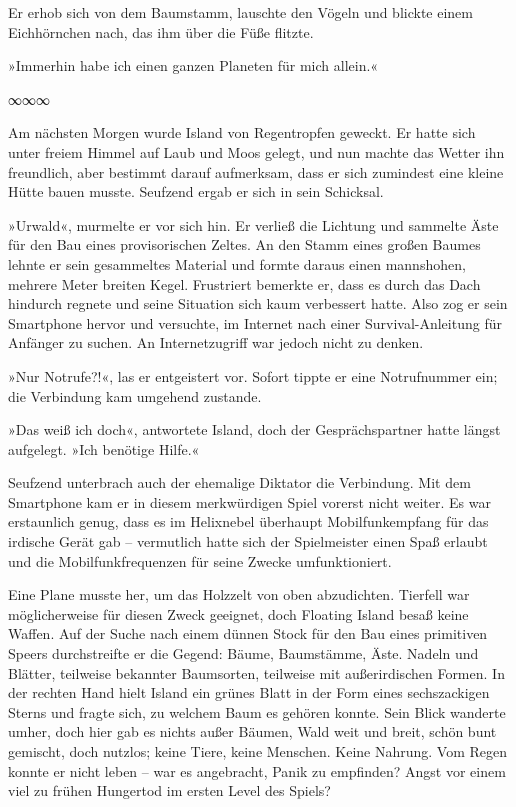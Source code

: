 Er erhob sich von dem Baumstamm, lauschte den Vögeln und blickte einem Eichhörnchen nach, das ihm über die Füße flitzte.

»Immerhin habe ich einen ganzen Planeten für mich allein.«

\begin{center}
∞∞∞
\end{center}

Am nächsten Morgen wurde Island von Regentropfen geweckt. Er hatte sich unter freiem Himmel auf Laub und Moos gelegt, und nun machte das Wetter ihn freundlich, aber bestimmt darauf aufmerksam, dass er sich zumindest eine kleine Hütte bauen musste. Seufzend ergab er sich in sein Schicksal.

»Urwald«, murmelte er vor sich hin. Er verließ die Lichtung und sammelte Äste für den Bau eines provisorischen Zeltes. An den Stamm eines großen Baumes lehnte er sein gesammeltes Material und formte daraus einen mannshohen, mehrere Meter breiten Kegel. Frustriert bemerkte er, dass es durch das Dach hindurch regnete und seine Situation sich kaum verbessert hatte. Also zog er sein Smartphone hervor und versuchte, im Internet nach einer Survival-Anleitung für Anfänger zu suchen. An Internetzugriff war jedoch nicht zu denken.

»Nur Notrufe?!«, las er entgeistert vor. Sofort tippte er eine Notrufnummer ein; die Verbindung kam umgehend zustande.


»Das weiß ich doch«, antwortete Island, doch der Gesprächspartner hatte längst aufgelegt. »Ich benötige Hilfe.«

Seufzend unterbrach auch der ehemalige Diktator die Verbindung. Mit dem Smartphone kam er in diesem merkwürdigen Spiel vorerst nicht weiter. Es war erstaunlich genug, dass es im Helixnebel überhaupt Mobilfunkempfang für das irdische Gerät gab – vermutlich hatte sich der Spielmeister einen Spaß erlaubt und die Mobilfunkfrequenzen für seine Zwecke umfunktioniert.

Eine Plane musste her, um das Holzzelt von oben abzudichten. Tierfell war möglicherweise für diesen Zweck geeignet, doch Floating Island besaß keine Waffen. Auf der Suche nach einem dünnen Stock für den Bau eines primitiven Speers durchstreifte er die Gegend: Bäume, Baumstämme, Äste. Nadeln und Blätter, teilweise bekannter Baumsorten, teilweise mit außerirdischen Formen. In der rechten Hand hielt Island ein grünes Blatt in der Form eines sechszackigen Sterns und fragte sich, zu welchem Baum es gehören konnte. Sein Blick wanderte umher, doch hier gab es nichts außer Bäumen, Wald weit und breit, schön bunt gemischt, doch nutzlos; keine Tiere, keine Menschen. Keine Nahrung. Vom Regen konnte er nicht leben – war es angebracht, Panik zu empfinden? Angst vor einem viel zu frühen Hungertod im ersten Level des Spiels?

